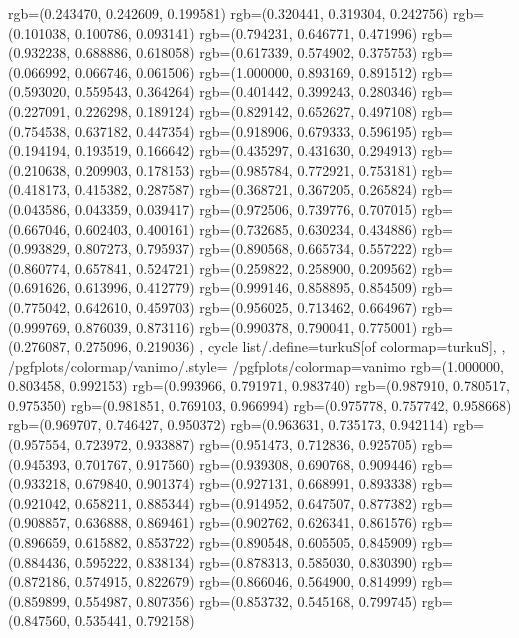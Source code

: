 {{{					rgb=(0.243470, 0.242609, 0.199581)
					rgb=(0.320441, 0.319304, 0.242756)
					rgb=(0.101038, 0.100786, 0.093141)
					rgb=(0.794231, 0.646771, 0.471996)
					rgb=(0.932238, 0.688886, 0.618058)
					rgb=(0.617339, 0.574902, 0.375753)
					rgb=(0.066992, 0.066746, 0.061506)
					rgb=(1.000000, 0.893169, 0.891512)
					rgb=(0.593020, 0.559543, 0.364264)
					rgb=(0.401442, 0.399243, 0.280346)
					rgb=(0.227091, 0.226298, 0.189124)
					rgb=(0.829142, 0.652627, 0.497108)
					rgb=(0.754538, 0.637182, 0.447354)
					rgb=(0.918906, 0.679333, 0.596195)
					rgb=(0.194194, 0.193519, 0.166642)
					rgb=(0.435297, 0.431630, 0.294913)
					rgb=(0.210638, 0.209903, 0.178153)
					rgb=(0.985784, 0.772921, 0.753181)
					rgb=(0.418173, 0.415382, 0.287587)
					rgb=(0.368721, 0.367205, 0.265824)
					rgb=(0.043586, 0.043359, 0.039417)
					rgb=(0.972506, 0.739776, 0.707015)
					rgb=(0.667046, 0.602403, 0.400161)
					rgb=(0.732685, 0.630234, 0.434886)
					rgb=(0.993829, 0.807273, 0.795937)
					rgb=(0.890568, 0.665734, 0.557222)
					rgb=(0.860774, 0.657841, 0.524721)
					rgb=(0.259822, 0.258900, 0.209562)
					rgb=(0.691626, 0.613996, 0.412779)
					rgb=(0.999146, 0.858895, 0.854509)
					rgb=(0.775042, 0.642610, 0.459703)
					rgb=(0.956025, 0.713462, 0.664967)
					rgb=(0.999769, 0.876039, 0.873116)
					rgb=(0.990378, 0.790041, 0.775001)
					rgb=(0.276087, 0.275096, 0.219036)
			},
		cycle list/.define={turkuS}{[of colormap=turkuS]},
		},
		/pgfplots/colormap/vanimo/.style={
			/pgfplots/colormap={vanimo}{%
					rgb=(1.000000, 0.803458, 0.992153)
					rgb=(0.993966, 0.791971, 0.983740)
					rgb=(0.987910, 0.780517, 0.975350)
					rgb=(0.981851, 0.769103, 0.966994)
					rgb=(0.975778, 0.757742, 0.958668)
					rgb=(0.969707, 0.746427, 0.950372)
					rgb=(0.963631, 0.735173, 0.942114)
					rgb=(0.957554, 0.723972, 0.933887)
					rgb=(0.951473, 0.712836, 0.925705)
					rgb=(0.945393, 0.701767, 0.917560)
					rgb=(0.939308, 0.690768, 0.909446)
					rgb=(0.933218, 0.679840, 0.901374)
					rgb=(0.927131, 0.668991, 0.893338)
					rgb=(0.921042, 0.658211, 0.885344)
					rgb=(0.914952, 0.647507, 0.877382)
					rgb=(0.908857, 0.636888, 0.869461)
					rgb=(0.902762, 0.626341, 0.861576)
					rgb=(0.896659, 0.615882, 0.853722)
					rgb=(0.890548, 0.605505, 0.845909)
					rgb=(0.884436, 0.595222, 0.838134)
					rgb=(0.878313, 0.585030, 0.830390)
					rgb=(0.872186, 0.574915, 0.822679)
					rgb=(0.866046, 0.564900, 0.814999)
					rgb=(0.859899, 0.554987, 0.807356)
					rgb=(0.853732, 0.545168, 0.799745)
					rgb=(0.847560, 0.535441, 0.792158)
}}}
